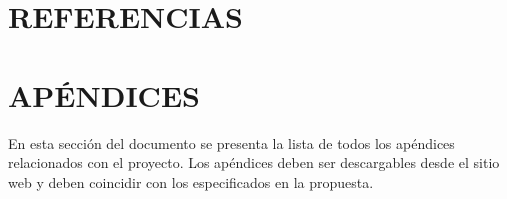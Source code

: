 \documentclass[11pt,oneside,letterpaper]{report}
\begin{document}


\newpage

\thispagestyle{empty}
\mbox{}
\newpage


\newpage

\thispagestyle{empty}
\mbox{}
\newpage


\newpage


\newpage


\newpage

\renewcommand{\contentsname}{CONTENIDO}
\tableofcontents
\newpage



\clearpage
\pagestyle{fancy}










\chapter*{REFERENCIAS}
\printbibliography[heading=none]

\chapter*{APÉNDICES}

En esta sección del documento se presenta la lista de todos los apéndices relacionados con el proyecto. Los apéndices deben ser descargables desde el sitio web y deben coincidir con los especificados en la propuesta.
\end{document}
